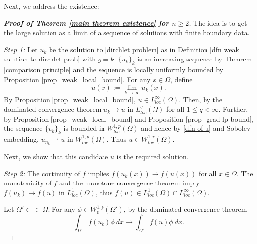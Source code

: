\documentclass[11pt]{amsart}
\numberwithin{equation}{section}
\begin{document}
 Next, we address the existence:
 \begin{proof}[\textbf{Proof of Theorem \ref{main theorem existence} for $n\geq 2$}]
   The idea is to get the large solution as a limit of a sequence of solutions with finite boundary data.
   
  \textit{Step 1:} Let $u_{k}$ be the solution to \eqref{dirchlet problem} as in Definition \ref{dfn weak solution to dirchlet prob} with $g=k$. $\{u_{k}\}_{k}$ is an increasing sequence by Theorem \ref{comparison principle} and the sequence is locally uniformly bounded by Proposition \ref{prop_weak_local_bound}. For any $x\in\Omega$, define
   \begin{equation}\label{dfn of u}
       u(x):=\lim_{k\to\infty}u_{k}(x).
   \end{equation}
   By Proposition \ref{prop_weak_local_bound}, $u\in L_{loc}^{\infty}(\Omega)$. Then, by the dominated convergence theorem $u_{k}\to u$ in $L^{q}_{loc}(\Omega)$ for all $1\leq q<\infty$. Further, by Proposition \ref{prop_weak_local_bound}
 and Proposition \ref{prop_grad lp bound}, the sequence $\{u_{k}\}_{k}$ is bounded in $W^{1,p}_{loc}(\Omega)$ and hence by \eqref{dfn of u} and Sobolev embedding, $u_{n_{k}}\rightharpoonup u$ in $W_{loc}^{1,p}(\Omega)$. Thus $u\in W_{loc}^{1,p}(\Omega)$. 
 
 Next, we show that this candidate $u$ is the required solution.
 
\textit{Step 2:}
 The continuity of $f$ implies $f(u_{k}(x))\to f(u(x))$ for all $x\in\Omega$. The monotonicity of $f$ and the monotone convergence theorem imply $f(u_{k})\to f(u)$ in $L^{1}_{loc}(\Omega)$, thus $f(u)\in L^{1}_{loc}(\Omega)\cap L^{\infty}_{loc}(\Omega)$.  

 Let $\Omega'\subset \subset \Omega$. For any $\phi\in W_{0}^{1,p}(\Omega')$, by the dominated convergence theorem 
 \begin{equation*}
     \int_{\Omega'}f(u_{k})\phi\ dx\to \int_{\Omega'}f(u)\phi\ dx.
 \end{equation*}


\end{proof}
\end{document}
